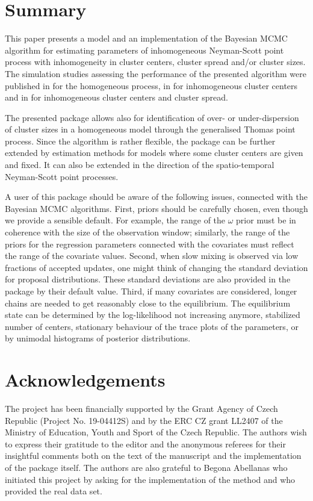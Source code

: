 \section{Summary}\label{sec:discussion}

This paper presents a model and an implementation of the Bayesian MCMC algorithm for estimating parameters of inhomogeneous Neyman-Scott point process with inhomogeneity in cluster centers, cluster spread and/or cluster sizes. The simulation studies {assessing} the performance of the presented algorithm were published in \cite{KM2016} for the homogeneous process, in \cite{MMK2014} for inhomogeneous cluster centers and in \cite{MS2017} for inhomogeneous cluster centers and cluster spread.   

The presented package  allows also for identification of over- or under-dispersion of cluster sizes in a homogeneous model through the generalised Thomas point process. Since the algorithm is rather flexible, the package can be further {extended} by estimation methods for models where some cluster centers are given and fixed. It can also be {extended} in the direction of the spatio-temporal Neyman-Scott point processes. 

A user of this package should be aware of the following issues, connected with the Bayesian MCMC algorithms. First, priors should be carefully chosen, even though we provide a {sensible} default. For example, the range of the $\omega$ prior must be in coherence with the size of the observation window; similarly, the range of the priors for the regression parameters connected with the covariates must reflect the range of the covariate values. Second, when {slow} mixing is observed via low fractions of accepted updates, one might think of changing the standard deviation for proposal distributions. These standard deviations are also provided in the package by their default value. Third, if many covariates are {considered}, longer chains are needed {to get reasonably close to the equilibrium}. The equilibrium state can be determined by {the log-likelihood not increasing anymore}, {stabilized} number of centers, {stationary behaviour of the trace plots of the parameters}, or by {unimodal} histograms of posterior distributions. 

\section*{Acknowledgements}
The project has been financially supported by the Grant Agency of Czech Republic (Project No. 19-04412S) and by the ERC CZ grant LL2407 of the Ministry of Education, Youth and Sport of the Czech Republic.
The authors wish to express their gratitude to the editor and the anonymous referees for their insightful comments both on the text of the manuscript and the implementation of the package itself. The authors are also grateful to Begona Abellanas who initiated this project by asking for the implementation of the method and who provided the real data set.

